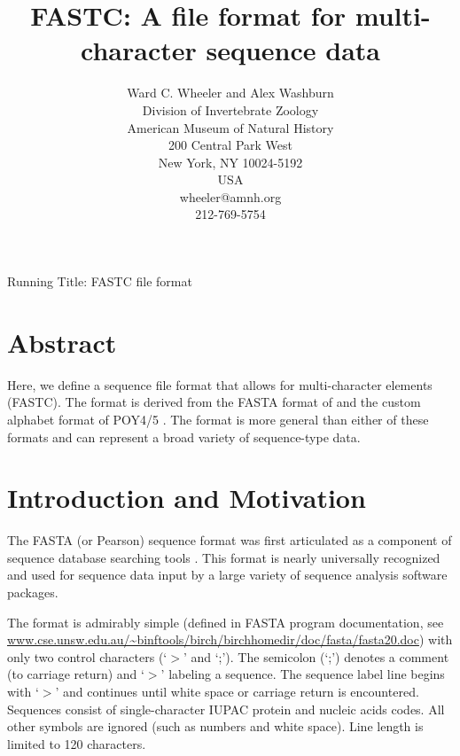 \documentclass[12pt]{article}
\begin{document}
\title{FASTC: A file format for multi-character sequence data}
\author{Ward C. Wheeler and Alex Washburn \\
		Division of  Invertebrate Zoology\\
		American Museum of Natural History\\
		200 Central Park West\\
		New York, NY 10024-5192\\
		USA\\
		wheeler@amnh.org\\
		212-769-5754}

\maketitle
\begin{center}
Running Title: FASTC file format
\end{center}
\newpage
\doublespacing

\section{Abstract}
Here, we define a sequence file format that allows for multi-character elements (FASTC).  The format is derived from the FASTA format of \cite{LipmanandPearson1985} and the custom alphabet format of POY4/5 \citep{POY4,Wheeleretal2015}.  The format is more general than either of these formats and can represent a broad variety of sequence-type data.

\newpage
\tableofcontents
\newpage

\section{Introduction and Motivation}
The FASTA (or Pearson) sequence format was first articulated as a component of sequence database searching tools
\citep{LipmanandPearson1985}.  This format is nearly universally recognized and used for sequence data input 
by a large variety of sequence analysis software packages.

The format is admirably simple (defined in FASTA program documentation, see \url{www.cse.unsw.edu.au/~binftools/birch/birchhomedir/doc/fasta/fasta20.doc}) with 
only two control characters (`$>$' and `;').  The semicolon (`;') denotes a comment (to carriage return) and `$>$' labeling a sequence.  
The sequence label line begins with `$>$' and continues until white space or carriage return is encountered.  Sequences consist of single-character
IUPAC protein and nucleic acids codes.  All other symbols are ignored (such as numbers and white space).  Line length is limited to 120 characters.
\end{document}
